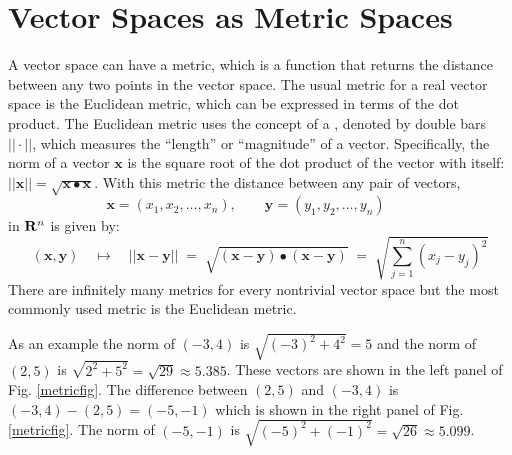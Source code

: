 \section{Vector Spaces as Metric Spaces}\label{metricSpace}


   A vector space can have a metric, which is a function that returns the 
distance between any two points in the vector space.  The usual metric for a 
real vector space is the Euclidean metric, which can be expressed in terms of 
the dot product.  The Euclidean metric uses the concept of a , 
denoted by double bars $|| \cdot ||$, which measures the ``length'' or 
``magnitude'' of a vector.  Specifically, the norm of a vector $\mathbf{x}$ is 
the square root of the dot product of the vector with itself: $||\mathbf{x}|| = 
\sqrt{\mathbf{x} \bullet \mathbf{x}}$.  With this metric the distance between 
any pair of vectors,
\begin{equation*}
\mathbf{x} = (x_1, x_2, \ldots, x_n), \qquad
\mathbf{y} = (y_1, y_2, \ldots, y_n) \qquad
\end{equation*}
in ${\bf R}^n$ is given by:
\begin{equation*}
\left(\mathbf{x}, \mathbf{y}\right) \quad \mapsto \quad
|| \mathbf{x} - \mathbf{y} || \; = \; 
\sqrt{ (\mathbf{x} - \mathbf{y}) \bullet (\mathbf{x} - \mathbf{y}) }
\; = \;  \sqrt{ \sum_{j=1}^n (x_j - y_j)^2 }
\end{equation*}
There are infinitely many metrics for every nontrivial vector space but the 
most commonly used metric is the Euclidean metric.

   As an example the norm of $(-3,4)$ is $\sqrt{(-3)^2+4^2} = 5$ and the norm 
of $(2,5)$ is $\sqrt{2^2+5^2} = \sqrt{29} \approx 5.385$.  These vectors are 
shown in the left panel of Fig. \ref{metricfig}.  The difference between 
$(2,5)$ and $(-3,4)$ is $(-3,4) - (2,5) = (-5,-1)$ which is shown in the right 
panel of Fig. \ref{metricfig}.  The norm of $(-5,-1)$ is $\sqrt{(-5)^2+(-1)^2} 
= \sqrt{26} \approx 5.099$.

